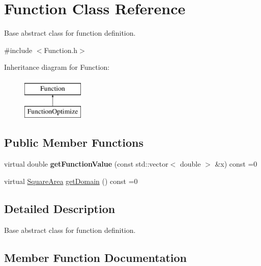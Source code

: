 \hypertarget{class_function}{}\section{Function Class Reference}
\label{class_function}


Base abstract class for function definition.  




{\ttfamily \#include $<$Function.\+h$>$}

Inheritance diagram for Function\+:\begin{figure}[H]
\begin{center}
\leavevmode
\includegraphics[height=2.000000cm]{class_function}
\end{center}
\end{figure}
\subsection*{Public Member Functions}
\begin{DoxyCompactItemize}
\item 
\mbox{\label{class_function_adbcade5ca15e4b152bb74d4c78caaa0e}} 
virtual double {\bfseries get\+Function\+Value} (const std\+::vector$<$ double $>$ \&x) const =0
\item 
virtual \hyperlink{class_square_area}{Square\+Area} \hyperlink{class_function_add150985034ade039806b8beb9890cdc}{get\+Domain} () const =0
\end{DoxyCompactItemize}


\subsection{Detailed Description}
Base abstract class for function definition. 

\subsection{Member Function Documentation}
\mbox{\label{class_function_add150985034ade039806b8beb9890cdc}} 
